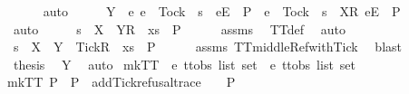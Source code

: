 \begin{isabellebody}
\ \ \ \ \isamarkupfalse%
\ auto\isanewline
\ \ \isamarkupfalse%
\ \isamarkupfalse%
\ {\isachardoublequoteopen}Y\ {\isasyminter}\ {\isacharbraceleft}e{\isachardot}\ {\isacharparenleft}e\ {\isasymnoteq}\ Tock\ {\isasymand}\ s\ {\isacharat}\ {\isacharbrackleft}{\isacharbrackleft}e{\isacharbrackright}\isactrlsub E{\isacharbrackright}\ {\isasymin}\ P{\isacharparenright}\ {\isasymor}\ {\isacharparenleft}e\ {\isacharequal}\ Tock\ {\isasymand}\ s\ {\isacharat}\ {\isacharbrackleft}{\isacharbrackleft}X{\isacharbrackright}\isactrlsub R{\isacharcomma}\ {\isacharbrackleft}e{\isacharbrackright}\isactrlsub E{\isacharbrackright}\ {\isasymin}\ P{\isacharparenright}\ {\isacharbraceright}\ {\isacharequal}\ {\isacharbraceleft}{\isacharbraceright}{\isachardoublequoteclose}\isanewline
\ \ \ \ \isamarkupfalse%
\ auto\isanewline
\ \ \isamarkupfalse%
\ \isamarkupfalse%
\ {\isachardoublequoteopen}s\ {\isacharat}\ {\isacharbrackleft}{\isacharbrackleft}X\ {\isasymunion}\ Y{\isacharbrackright}\isactrlsub R{\isacharbrackright}\ {\isacharat}\ xs\ {\isasymin}\ P{\isachardoublequoteclose}\isanewline
\ \ \ \ \isamarkupfalse%
\ assms\ \isamarkupfalse%
\ TT{}{\isacharunderscore}def\ \isamarkupfalse%
\ auto\isanewline
\ \ \isamarkupfalse%
\ \isamarkupfalse%
\ {\isachardoublequoteopen}s\ {\isacharat}\ {\isacharbrackleft}{\isacharbrackleft}X\ {\isasymunion}\ Y\ {\isasymunion}\ {\isacharbraceleft}Tick{\isacharbraceright}{\isacharbrackright}\isactrlsub R{\isacharbrackright}\ {\isacharat}\ xs\ {\isasymin}\ P{\isachardoublequoteclose}\isanewline
\ \ \ \ \isamarkupfalse%
\ assms\ TT{}{\isacharunderscore}middle{\isacharunderscore}Ref{\isacharunderscore}with{\isacharunderscore}Tick\ \isamarkupfalse%
\ blast\isanewline
\ \ \isamarkupfalse%
\ \isamarkupfalse%
\ {\isacharquery}thesis\ \isamarkupfalse%
\ Y\ \isamarkupfalse%
\ auto\isanewline
{}\isamarkupfalse%
%
\endisatagproof
{\isafoldproof}%
%
\isadelimproof
\isanewline
%
\endisadelimproof
\isanewline
{}\isamarkupfalse%
\ mkTT{}\ {\isacharcolon}{\isacharcolon}\ {\isachardoublequoteopen}{\isacharprime}e\ ttobs\ list\ set\ {\isasymRightarrow}\ {\isacharprime}e\ ttobs\ list\ set{\isachardoublequoteclose}\ \isanewline
{\isachardoublequoteopen}mkTT{}\ P\ {\isacharequal}\ P\ {\isasymunion}\ {\isacharbraceleft}add{\isacharunderscore}Tick{\isacharunderscore}refusal{\isacharunderscore}trace\ {\isasymrho}{\isacharbar}{\isasymrho}{\isachardot}\ {\isasymrho}\ {\isasymin}\ P{\isacharbraceright}{\isachardoublequoteclose}\isanewline

\end{isabellebody}

